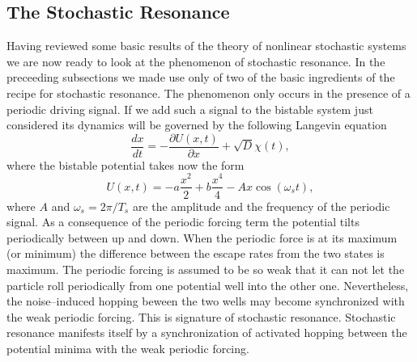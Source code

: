 \subsection{The Stochastic Resonance}
Having reviewed some basic results of the theory of nonlinear stochastic
systems we are now ready to look at the phenomenon of stochastic resonance.
In the preceeding subsections we made use only of two of the basic ingredients
of the recipe for stochastic resonance. The phenomenon only occurs in the
presence of a periodic driving signal. If we add such a signal to the bistable
system just considered its dynamics will be governed by the following Langevin
equation
\begin{equation}
  \frac{dx}{dt} = - \frac{\partial U(x,t)}{\partial x} + \sqrt{D} \chi(t), 
\end{equation}
where the bistable potential takes now the form
\begin{equation}
\label{eq:bistablepotential}
  U(x,t) = -a \frac{x^2}{2} +b \frac{x^4}{4} - Ax \cos(\omega_s t),
\end{equation}
where $A$ and $\omega_s= 2 \pi/T_s$ are the amplitude 
and the frequency of the periodic
signal. As a consequence of the periodic forcing term the potential tilts
periodically between up  and down. When the periodic force is at its
maximum (or minimum)  the difference between the escape rates from the two
states is maximum. The periodic forcing is assumed to be so
weak that it can not let the particle roll periodically from one potential
well into the other one. Nevertheless, the noise--induced hopping beween the
two wells  may become synchronized with the weak periodic forcing. This is 
signature of stochastic resonance. Stochastic resonance manifests itself by a
synchronization of activated hopping between the potential minima with the
weak periodic forcing. 

